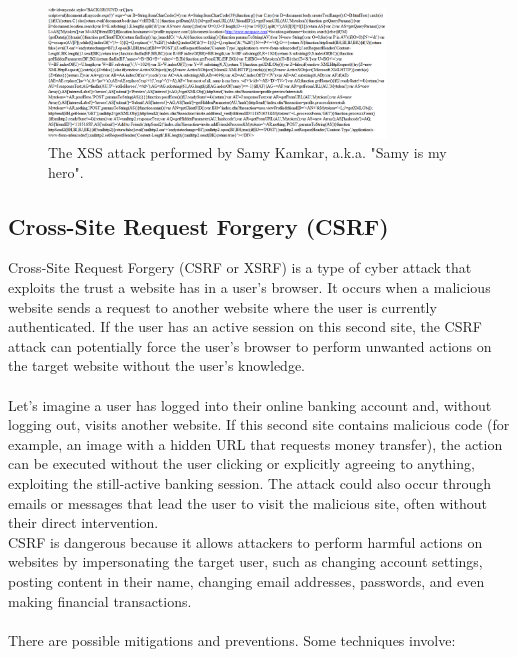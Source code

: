 \documentclass{article}
\begin{document}
\begin{figure}[ht]
\centering
\includegraphics[width=0.8\textwidth]{images/2.png}
\caption{The XSS attack performed by Samy Kamkar, a.k.a. "Samy is my hero".}
\label{fig:xss}
\end{figure}

\subsection{Cross-Site Request Forgery (CSRF)}
Cross-Site Request Forgery (CSRF or XSRF) is a type of cyber attack that exploits the trust a website has in a user's browser. It occurs when a malicious website sends a request to another website where the user is currently authenticated. If the user has an active session on this second site, the CSRF attack can potentially force the user's browser to perform unwanted actions on the target website without the user's knowledge.
\\
\\
Let's imagine a user has logged into their online banking account and, without logging out, visits another website. If this second site contains malicious code (for example, an image with a hidden URL that requests money transfer), the action can be executed without the user clicking or explicitly agreeing to anything, exploiting the still-active banking session. The attack could also occur through emails or messages that lead the user to visit the malicious site, often without their direct intervention.
\\
CSRF is dangerous because it allows attackers to perform harmful actions on websites by impersonating the target user, such as changing account settings, posting content in their name, changing email addresses, passwords, and even making financial transactions.
\\
\\
There are possible mitigations and preventions. Some techniques involve:
\end{document}
